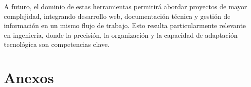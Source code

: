 \documentclass[runningheads]{llncs}
\begin{document}
A futuro, el dominio de estas herramientas permitirá abordar proyectos de mayor complejidad, integrando desarrollo web, documentación técnica y gestión de información en un mismo flujo de trabajo. Esto resulta particularmente relevante en ingeniería, donde la precisión, la organización y la capacidad de adaptación tecnológica son competencias clave.

\section{Anexos}





\end{document}
